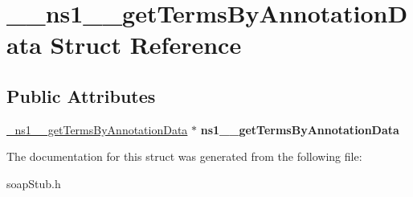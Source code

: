 \hypertarget{struct____ns1____getTermsByAnnotationData}{
\section{\_\-\_\-ns1\_\-\_\-getTermsByAnnotationData Struct Reference}
\label{struct____ns1____getTermsByAnnotationData}
}
\subsection*{Public Attributes}
\begin{DoxyCompactItemize}
\item 
\hypertarget{struct____ns1____getTermsByAnnotationData_aa364d251277ef0813f320f7488b3e01c}{
\hyperlink{class__ns1____getTermsByAnnotationData}{\_\-ns1\_\-\_\-getTermsByAnnotationData} $\ast$ {\bfseries ns1\_\-\_\-getTermsByAnnotationData}}
\label{struct____ns1____getTermsByAnnotationData_aa364d251277ef0813f320f7488b3e01c}

\end{DoxyCompactItemize}


The documentation for this struct was generated from the following file:\begin{DoxyCompactItemize}
\item 
soapStub.h\end{DoxyCompactItemize}
